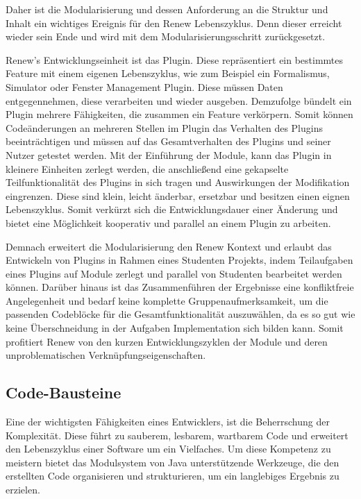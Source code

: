 	Daher ist die Modularisierung und dessen Anforderung an die Struktur und Inhalt ein wichtiges Ereignis für den Renew Lebenszyklus. Denn dieser erreicht wieder sein Ende und wird mit dem Modularisierungsschritt zurückgesetzt. \bigbreak

	Renew's Entwicklungseinheit ist das Plugin. Diese repräsentiert ein bestimmtes Feature mit einem eigenen Lebenszyklus, wie zum Beispiel ein Formalismus, Simulator oder Fenster Management Plugin. Diese müssen Daten entgegennehmen, diese verarbeiten und wieder ausgeben. Demzufolge bündelt ein Plugin mehrere Fähigkeiten, die zusammen ein Feature verkörpern. Somit können Codeänderungen an mehreren Stellen im Plugin das Verhalten des Plugins beeinträchtigen und müssen auf das Gesamtverhalten des Plugins und seiner Nutzer getestet werden. Mit der Einführung der Module, kann das Plugin in kleinere Einheiten zerlegt werden, die anschließend eine gekapselte Teilfunktionalität des Plugins in sich tragen und Auswirkungen der Modifikation eingrenzen. Diese sind klein, leicht änderbar, ersetzbar und besitzen einen eignen Lebenszyklus. Somit verkürzt sich die Entwicklungsdauer einer Änderung und bietet eine Möglichkeit kooperativ und parallel an einem Plugin zu arbeiten. \newline

	Demnach erweitert die Modularisierung den Renew Kontext und erlaubt das Entwickeln von Plugins in Rahmen eines Studenten Projekts, indem Teilaufgaben eines Plugins auf Module zerlegt und parallel von Studenten bearbeitet werden können. Darüber hinaus ist das Zusammenführen der Ergebnisse eine konfliktfreie Angelegenheit und bedarf keine komplette Gruppenaufmerksamkeit, um die passenden Codeblöcke für die Gesamtfunktionalität auszuwählen, da es so gut wie keine Überschneidung in der Aufgaben Implementation sich bilden kann. Somit profitiert Renew von den kurzen Entwicklungszyklen der Module und deren unproblematischen Verknüpfungseigenschaften. 

\subsection{Code-Bausteine}\label{sub:cbs}
	Eine der wichtigsten Fähigkeiten eines Entwicklers, ist die Beherrschung der Komplexität. Diese führt zu sauberem, lesbarem, wartbarem Code und erweitert den Lebenszyklus einer Software um ein Vielfaches. Um diese Kompetenz zu meistern bietet das Modulsystem von Java unterstützende Werkzeuge, die den erstellten Code organisieren und strukturieren, um ein langlebiges Ergebnis zu erzielen.  \newline

